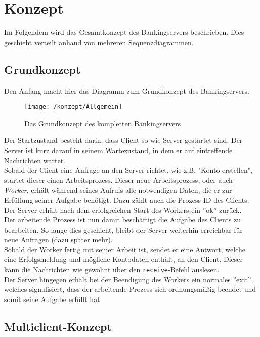\section{Konzept}

Im Folgendem wird das Gesamtkonzept des Bankingservers beschrieben. Dies geschieht verteilt anhand von mehreren Sequenzdiagrammen.\\

\subsection{Grundkonzept}

Den Anfang macht hier das Diagramm zum Grundkonzept des Bankingservers.

\begin{figure}
\centering
\texttt{[image: /konzept/Allgemein]}
\caption{Das Grundkonzept des kompletten Bankingservers}
\label{fig:grundkonzept}
\end{figure}

Der Startzustand besteht darin, dass Client so wie Server gestartet sind. Der Server ist kurz darauf in seinem Wartezustand, in dem er auf eintreffende Nachrichten wartet.\\
Sobald der Client eine Anfrage an den Server richtet, wie z.B. "Konto erstellen", startet dieser einen Arbeitsprozess. Dieser neue Arbeitsprozess, oder auch \textit{Worker}, erhält während seines Aufrufs alle notwendigen Daten, die er zur Erfüllung seiner Aufgabe benötigt. Dazu zählt auch die Prozess-ID des Clients.\\
Der Server erhält nach dem erfolgreichen Start des Workers ein ''ok'' zurück.\\
Der arbeitende Prozess ist nun damit beschäftigt die Aufgabe des Clients zu bearbeiten. So lange dies geschieht, bleibt der Server weiterhin erreichbar für neue Anfragen (dazu später mehr).\\
Sobald der Worker fertig mit seiner Arbeit ist, sendet er eine Antwort, welche eine Erfolgsmeldung und mögliche Kontodaten enthält, an den Client. Dieser kann die Nachrichten wie gewohnt über den \texttt{receive}-Befehl auslesen.\\
Der Server hingegen erhält bei der Beendigung des Workers ein normales ''exit'', welches signalisiert, dass der arbeitende Prozess sich ordnungsmäßig beendet und somit seine Aufgabe erfüllt hat.

\subsection{Multiclient-Konzept}

